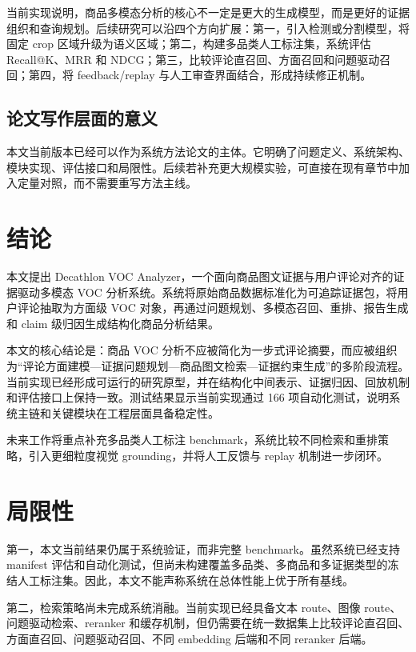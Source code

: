 \documentclass[11pt]{article}
\begin{document}
当前实现说明，商品多模态分析的核心不一定是更大的生成模型，而是更好的证据组织和查询规划。后续研究可以沿四个方向扩展：第一，引入检测或分割模型，将固定 crop 区域升级为语义区域；第二，构建多品类人工标注集，系统评估 Recall@K、MRR 和 NDCG；第三，比较评论直召回、方面召回和问题驱动召回；第四，将 feedback/replay 与人工审查界面结合，形成持续修正机制。

\subsection{论文写作层面的意义}

本文当前版本已经可以作为系统方法论文的主体。它明确了问题定义、系统架构、模块实现、评估接口和局限性。后续若补充更大规模实验，可直接在现有章节中加入定量对照，而不需要重写方法主线。

\section{结论}
本文提出 Decathlon VOC Analyzer，一个面向商品图文证据与用户评论对齐的证据驱动多模态 VOC 分析系统。系统将原始商品数据标准化为可追踪证据包，将用户评论抽取为方面级 VOC 对象，再通过问题规划、多模态召回、重排、报告生成和 claim 级归因生成结构化商品分析结果。

本文的核心结论是：商品 VOC 分析不应被简化为一步式评论摘要，而应被组织为``评论方面建模---证据问题规划---商品图文检索---证据约束生成''的多阶段流程。当前实现已经形成可运行的研究原型，并在结构化中间表示、证据归因、回放机制和评估接口上保持一致。测试结果显示当前实现通过 166 项自动化测试，说明系统主链和关键模块在工程层面具备稳定性。

未来工作将重点补充多品类人工标注 benchmark，系统比较不同检索和重排策略，引入更细粒度视觉 grounding，并将人工反馈与 replay 机制进一步闭环。

\section{局限性}
第一，本文当前结果仍属于系统验证，而非完整 benchmark。虽然系统已经支持 manifest 评估和自动化测试，但尚未构建覆盖多品类、多商品和多证据类型的冻结人工标注集。因此，本文不能声称系统在总体性能上优于所有基线。

第二，检索策略尚未完成系统消融。当前实现已经具备文本 route、图像 route、问题驱动检索、reranker 和缓存机制，但仍需要在统一数据集上比较评论直召回、方面直召回、问题驱动召回、不同 embedding 后端和不同 reranker 后端。
\end{document}
